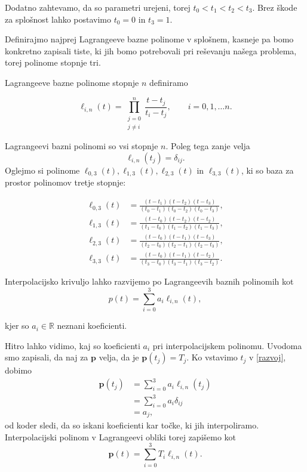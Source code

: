 \documentclass[mat1]{fmfdelo}
\newcommand{\R}{\mathbb R}
\begin{document}
Dodatno zahtevamo, da so parametri urejeni, torej $t_0 < t_1 < t_2 < t_3$. Brez škode za splošnost lahko postavimo $t_0 = 0$ in $t_3 = 1$.

Definirajmo najprej Lagrangeeve bazne polinome v splošnem, kasneje pa bomo konkretno zapisali tiste, ki jih bomo potrebovali pri reševanju našega problema, torej polinome stopnje tri.


\begin{definicija}
Lagrangeeve bazne polinome stopnje $n$ definiramo

$$ \ell_{i,n}(t) = \prod_{\substack{j=0 \\ j \neq i}}^{n} \frac{t - t_j}{t_i - t_j} , \qquad i = 0, 1, \ldots n.$$	
\end{definicija}

Lagrangeevi bazni polinomi so vsi stopnje $n$. Poleg tega zanje velja $$\ell_{i,n}(t_j) = \delta_{ij}.$$
Oglejmo si polinome $ \ell_{0,3}(t), \ell_{1,3}(t), \ell_{2,3}(t)$ in $ \ell_{3,3}(t) $, ki so baza za prostor polinomov tretje stopnje:

\begin{align*}
	\ell_{0,3}(t) &= \frac{(t - t_1)(t - t_2)(t - t_3)}{(t_0 - t_1)(t_0 - t_2)(t_0 - t_3)}, \\
	\ell_{1,3}(t) &= \frac{(t - t_0)(t - t_2)(t - t_2)}{(t_1 - t_0)(t_1 - t_2)(t_1 - t_3)}, \\
	\ell_{2,3}(t) &= \frac{(t - t_0)(t - t_1)(t - t_3)}{(t_2 - t_0)(t_2 - t_1)(t_2 - t_3)}, \\
	\ell_{3,3}(t) &= \frac{(t - t_0)(t - t_1)(t - t_2)}{(t_3 - t_0)(t_3 - t_1)(t_3 - t_2)}. 	
\end{align*}

Interpolacijsko krivuljo lahko razvijemo po Lagrangeevih baznih polinomih kot 
\begin{equation}\label{razvoj}
p(t) = \sum_{i=0}^{3} a_i \ell_{i,n}(t),
\end{equation}

kjer so $a_i \in \R$ neznani koeficienti.

Hitro lahko vidimo, kaj so koeficienti $a_i$ pri interpolacijskem polinomu. Uvodoma smo zapisali, da naj za $\textbf{p}$ velja, da je $\textbf{p}(t_j) = T_j$. Ko vstavimo $t_j$ v \eqref{razvoj}, dobimo
\begin{align*}
\textbf{p}(t_j) &=  \sum_{i=0}^{3} a_i \ell_{i,n}(t_j) \\
	 &= \sum_{i=0}^{3} a_i \delta_{ij} \\
	&= a_j
,\end{align*}
od koder sledi, da so iskani koeficienti kar točke, ki jih interpoliramo. Interpolacijski polinom v Lagrangeevi obliki torej zapišemo kot 
$$\textbf{p}(t) = \sum_{i=0}^{3} T_i \ell_{i,n}(t).$$
\end{document}
